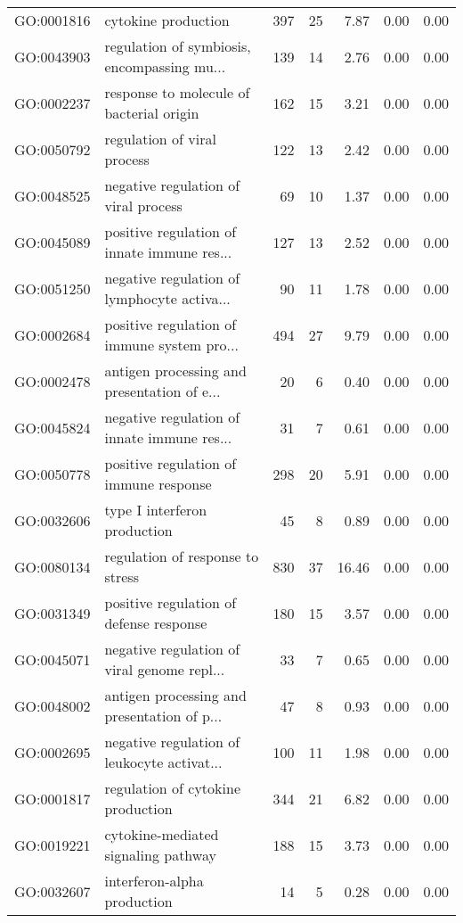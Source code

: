 \begin{table}[ht]
\begin{tabular}{llrrrrr}
  GO:0001816 & cytokine production & 397 &  25 & 7.87 & 0.00 & 0.00 \\ 
  GO:0043903 & regulation of symbiosis, encompassing mu... & 139 &  14 & 2.76 & 0.00 & 0.00 \\ 
  GO:0002237 & response to molecule of bacterial origin & 162 &  15 & 3.21 & 0.00 & 0.00 \\ 
  GO:0050792 & regulation of viral process & 122 &  13 & 2.42 & 0.00 & 0.00 \\ 
  GO:0048525 & negative regulation of viral process &  69 &  10 & 1.37 & 0.00 & 0.00 \\ 
  GO:0045089 & positive regulation of innate immune res... & 127 &  13 & 2.52 & 0.00 & 0.00 \\ 
  GO:0051250 & negative regulation of lymphocyte activa... &  90 &  11 & 1.78 & 0.00 & 0.00 \\ 
  GO:0002684 & positive regulation of immune system pro... & 494 &  27 & 9.79 & 0.00 & 0.00 \\ 
  GO:0002478 & antigen processing and presentation of e... &  20 &   6 & 0.40 & 0.00 & 0.00 \\ 
  GO:0045824 & negative regulation of innate immune res... &  31 &   7 & 0.61 & 0.00 & 0.00 \\ 
  GO:0050778 & positive regulation of immune response & 298 &  20 & 5.91 & 0.00 & 0.00 \\ 
  GO:0032606 & type I interferon production &  45 &   8 & 0.89 & 0.00 & 0.00 \\ 
  GO:0080134 & regulation of response to stress & 830 &  37 & 16.46 & 0.00 & 0.00 \\ 
  GO:0031349 & positive regulation of defense response & 180 &  15 & 3.57 & 0.00 & 0.00 \\ 
  GO:0045071 & negative regulation of viral genome repl... &  33 &   7 & 0.65 & 0.00 & 0.00 \\ 
  GO:0048002 & antigen processing and presentation of p... &  47 &   8 & 0.93 & 0.00 & 0.00 \\ 
  GO:0002695 & negative regulation of leukocyte activat... & 100 &  11 & 1.98 & 0.00 & 0.00 \\ 
  GO:0001817 & regulation of cytokine production & 344 &  21 & 6.82 & 0.00 & 0.00 \\ 
  GO:0019221 & cytokine-mediated signaling pathway & 188 &  15 & 3.73 & 0.00 & 0.00 \\ 
  GO:0032607 & interferon-alpha production &  14 &   5 & 0.28 & 0.00 & 0.00 \\ 

\end{tabular}
\end{table}
